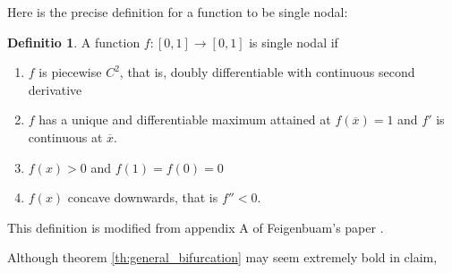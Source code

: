 \documentclass{report}
\theoremstyle{definition}
\newtheorem{defn}[thm]{Definitio}
\theoremstyle{definition}
\theoremstyle{remark}
\newcommand{\mx}{\overline{x}}
\begin{document}
Here is the precise definition for a function to be single nodal:


\begin{defn}
	A function $f: [0,1] \rightarrow [0,1]$ is single nodal if 
	\begin{enumerate}
		\item $f$ is piecewise $C^2$, that is, doubly differentiable with continuous second derivative
		\item $f$ has a unique and differentiable maximum attained at $f(\mx) = 1$ and $f'$ is continuous at $\mx$.
		\item $f(x) > 0$ and $f(1) = f(0) =0$
		\item $f(x)$ concave downwards, that is $f'' < 0$.
	\end{enumerate}

	This definition is modified from appendix A of Feigenbuam's paper \cite{F1}.
\end{defn}

Although theorem \ref{th:general_bifurcation} may seem extremely bold in claim, 

\printbibliography
\end{document}
